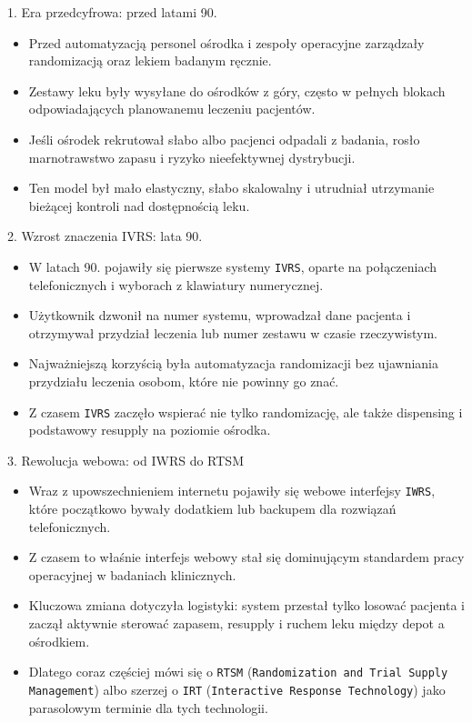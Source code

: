 \begin{frame}{1. Era przedcyfrowa: przed latami 90.}
  \begin{itemize}
    \item Przed automatyzacją personel ośrodka i zespoły operacyjne zarządzały randomizacją oraz lekiem badanym ręcznie.
    \item Zestawy leku były wysyłane do ośrodków z góry, często w pełnych blokach odpowiadających planowanemu leczeniu pacjentów.
    \item Jeśli ośrodek rekrutował słabo albo pacjenci odpadali z badania, rosło marnotrawstwo zapasu i ryzyko nieefektywnej dystrybucji.
    \item Ten model był mało elastyczny, słabo skalowalny i utrudniał utrzymanie bieżącej kontroli nad dostępnością leku.
  \end{itemize}
\end{frame}

\begin{frame}{2. Wzrost znaczenia IVRS: lata 90.}
  \begin{itemize}
    \item W latach 90. pojawiły się pierwsze systemy \texttt{IVRS}, oparte na połączeniach telefonicznych i wyborach z klawiatury numerycznej.
    \item Użytkownik dzwonił na numer systemu, wprowadzał dane pacjenta i otrzymywał przydział leczenia lub numer zestawu w czasie rzeczywistym.
    \item Najważniejszą korzyścią była automatyzacja randomizacji bez ujawniania przydziału leczenia osobom, które nie powinny go znać.
    \item Z czasem \texttt{IVRS} zaczęło wspierać nie tylko randomizację, ale także dispensing i podstawowy resupply na poziomie ośrodka.
  \end{itemize}
\end{frame}

\begin{frame}{3. Rewolucja webowa: od IWRS do RTSM}
  \begin{itemize}
    \item Wraz z upowszechnieniem internetu pojawiły się webowe interfejsy \texttt{IWRS}, które początkowo bywały dodatkiem lub backupem dla rozwiązań telefonicznych.
    \item Z czasem to właśnie interfejs webowy stał się dominującym standardem pracy operacyjnej w badaniach klinicznych.
    \item Kluczowa zmiana dotyczyła logistyki: system przestał tylko losować pacjenta i zaczął aktywnie sterować zapasem, resupply i ruchem leku między depot a ośrodkiem.
    \item Dlatego coraz częściej mówi się o \texttt{RTSM} (\texttt{Randomization and Trial Supply Management}) albo szerzej o \texttt{IRT} (\texttt{Interactive Response Technology}) jako parasolowym terminie dla tych technologii.
  \end{itemize}
\end{frame}

